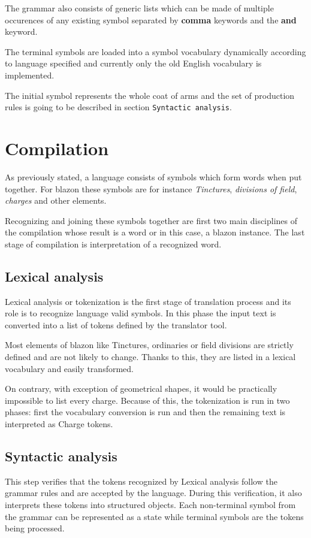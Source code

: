 \documentclass[12pt,a4paper]{article}
\let\oldsection\section
\renewcommand\section{\clearpage\oldsection}
\begin{document}
The grammar also consists of generic lists which can be made of multiple occurences of any existing symbol separated by \textbf{comma} keywords and the \textbf{and} keyword.

The terminal symbols are loaded into a symbol vocabulary dynamically according to language specified and currently only the old English vocabulary is implemented.

The initial symbol represents the whole coat of arms and the set of production rules is going to be described in section \texttt{Syntactic analysis}.


\section{Compilation}
As previously stated, a language consists of symbols which form words when put together.
For blazon these symbols are for instance \textit{Tinctures}, \textit{divisions of field}, \textit{charges} and other elements.

Recognizing and joining these symbols together are first two main disciplines of the compilation whose result is a word or in this case, a blazon instance.
The last stage of compilation is interpretation of a recognized word.


\subsection{Lexical analysis} 
Lexical analysis or tokenization is the first stage of translation process and its role is to recognize language valid symbols.
In this phase the input text is converted into a list of tokens defined by the translator tool.

Most elements of blazon like Tinctures, ordinaries or field divisions are strictly defined and are not likely to change. 
Thanks to this, they are listed in a lexical vocabulary and easily transformed.

On contrary, with exception of geometrical shapes, it would be practically impossible to list every charge.
Because of this, the tokenization is run in two phases: first the vocabulary conversion is run and then the remaining text is interpreted as Charge tokens.



\subsection{Syntactic analysis} 
This step verifies that the tokens recognized by Lexical analysis follow the grammar rules and are accepted by the language. During this verification, it also interprets these tokens into structured objects.
Each non-terminal symbol from the grammar can be represented as a state while terminal symbols are the tokens being processed.
\end{document}
